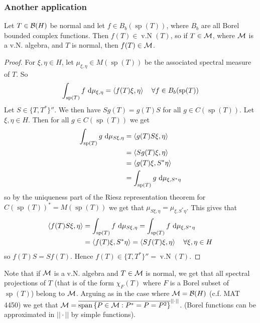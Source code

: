\documentclass[10pt,english,a4paper]{article}
\theoremstyle{definition}
\DeclareMathOperator{\Sp}{sp}
\DeclareMathOperator{\vN}{v.N}
\begin{document}
\subsubsection*{Another application}
Let $T \in \mathcal{B}(H)$ be normal and let $f \in B_{b}(\Sp(T))$, where 
$B_{b}$ are all Borel bounded complex functions. Then 
$f(T) \in \vN(T)$, so if $T \in \mathcal{M}$, where $\mathcal{M}$ is a v.N. algebra, and 
$T$ is normal, then $f(T) \in \mathcal{M}$. 
\begin{proof}
    For $\xi,\eta \in H$, let $\mu_{\xi,\eta} \in M(\Sp(T))$ be the associated 
spectral measure of $T$. 
So 
\[ \int_{\Sp(T)} f \d\mu_{\xi,\eta} = \ind{f(T)\xi,\eta} \quad\forall f \in B_{b}(\Sp(T)) \]
Let $S \in\{T, T^*\}''$. We then have 
$Sg(T) = g(T)S$ for all $g \in C(\Sp(T))$. 
Let $\xi,\eta \in H$. Then for all $g \in C(\Sp(T))$ we get 
\begin{align*}
    \int_{\Sp(T)} g \d\mu_{S\xi,\eta} &= \ind{g(T)S\xi,\eta} \\
    &= \ind{Sg(T)\xi,\eta} \\
    &= \ind{g(T)\xi,S^*\eta} \\
    &= \int_{\Sp(T)} g \d \mu_{\xi,S^*\eta}
\end{align*}
so by the uniqueness part of the Riesz representation theorem for 
$C(\Sp(T))^* = M(\Sp(T))$ we get that 
$\mu_{S\xi,\eta} = \mu_{\xi,S^*\eta}$.
This gives that 
\begin{align*}
    \ind{f(T)S\xi,\eta} 
&= \int_{\Sp(T)} f\d\mu_{S\xi,\eta} 
= \int_{\Sp(T)} f\d\mu_{\xi,S^*\eta} \\
&= \ind{f(T)\xi, S^*\eta} 
= \ind{Sf(T)\xi,\eta} \quad \forall \xi,\eta \in H
\end{align*}
so $f(T)S = Sf(T)$. Hence $f(T) \in \{T,T^*\}'' = \vN(T)$.
\end{proof}
Note that if $\mathcal{M}$ is a v.N. algebra and $T \in \mathcal{M}$ is normal, we get that all
spectral projections of $T$ (that is of the form $\chi_F(T)$ where $F$ is a Borel
subset of $\Sp(T)$) belong to $\mathcal{M}$.
Arguing as in the case where $\mathcal{M} = \mathcal{B}(H)$ (c.f. MAT 4450) we get that 
$\mathcal{M} = \overline{\text{span} \left\{P\in \mathcal{M}: P^* = P = P^2\right\}}^{||\cdot||}$.
(Borel functions can be approximated in $||\cdot||$ by simple functions). 
\end{document}
